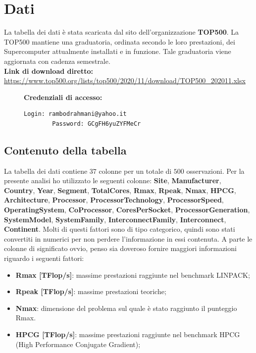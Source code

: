 \documentclass[11pt,a4paper]{article}
\begin{document}
\section{Dati}
La tabella dei dati \`e stata scaricata dal sito dell'organizzazione
\textbf{TOP500}. La TOP500 mantiene una graduatoria, ordinata secondo le loro
prestazioni, dei Supercomputer attualmente installati e in funzione. Tale
graduatoria viene aggiornata con cadenza semestrale.\\
\textbf{Link di download diretto:} \url{https://www.top500.org/lists/top500/2020/11/download/TOP500_202011.xlsx}\\
\begin{figure}[h]
	\vspace{-1cm}
	\begin{minipage}{.3\textwidth}
		\textbf{Credenziali di accesso:}
	\end{minipage}
	\begin{minipage}{0.7\textwidth} 
		\begin{lstlisting}[language=bash,tabsize=2,backgroundcolor=\color{Goldenrod}]
		Login: rambodrahmani@yahoo.it
		Password: GCgFH6yuZYFMeCr
		\end{lstlisting}
	\end{minipage}
	\vspace{-1cm}
\end{figure}
\subsection{Contenuto della tabella}
La tabella dei dati contiene $37$ colonne per un totale di $500$ osservazioni.
Per la presente analisi ho utilizzato le seguenti colonne: \textbf{Site},
\textbf{Manufacturer}, \textbf{Country}, \textbf{Year}, \textbf{Segment},
\textbf{TotalCores}, \textbf{Rmax}, \textbf{Rpeak}, \textbf{Nmax},
\textbf{HPCG}, \textbf{Architecture}, \textbf{Processor},
\textbf{ProcessorTechnology}, \textbf{ProcessorSpeed}, \textbf{OperatingSystem},
\textbf{CoProcessor}, \textbf{CoresPerSocket}, \textbf{ProcessorGeneration},
\textbf{SystemModel}, \textbf{SystemFamily}, \textbf{InterconnectFamily},
\textbf{Interconnect}, \textbf{Continent}. Molti di questi fattori sono di tipo
categorico, quindi sono stati convertiti in numerici per non perdere
l'informazione in essi contenuta. A parte le colonne di significato ovvio, penso
sia doveroso fornire maggiori informazioni riguardo i seguenti fattori:
\begin{itemize}
	\setlength\itemsep{0mm}
	\item \textbf{Rmax [TFlop/s]}: massime prestazioni raggiunte nel
		benchmark LINPACK;
	\item \textbf{Rpeak [TFlop/s]}: massime prestazioni teoriche;
	\item \textbf{Nmax}: dimensione del problema sul quale \`e stato
		raggiunto il punteggio Rmax.
	\item \textbf{HPCG [TFlop/s]}: massime prestazioni raggiunte nel
		benchmark HPCG (High Performance Conjugate Gradient);
\end{itemize}
\end{document}
